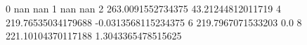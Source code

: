 0 nan nan
1 nan nan
2 263.0091552734375 43.21244812011719
4 219.76535034179688 -0.0313568115234375
6 219.7967071533203 0.0
8 221.10104370117188 1.3043365478515625
